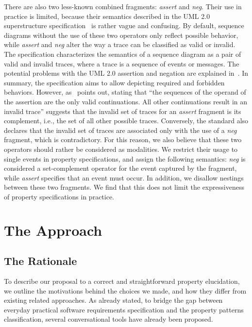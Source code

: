 \documentclass[letter]{llncs}
\begin{document}
There are also two less-known combined fragments: \emph{assert} and \emph{neg}. Their use in practice
is limited, because their semantics described in the UML 2.0 superstructure specification~\cite{UML2.4_superstructure}
is rather vague and confusing. By default, sequence diagrams without the use of these two operators 
only reflect possible behavior, while \emph{assert} and \emph{neg} alter the way 
a trace can be classified as valid or invalid. The specification characterizes
the semantics of a sequence diagram as a pair of valid and invalid traces,
where a trace is a sequence of events or messages.
The potential problems with the UML 2.0 assertion and negation are explained in~\cite{Harel07assertand}.
In summary, the specification aims to allow depicting required and forbidden behaviors.
However, as~\cite{Harel07assertand} points out, stating that ``the sequences of the operand of the assertion are the only valid continuations. All other continuations result in an invalid trace''
suggests that the invalid set of traces for an \emph{assert} fragment is its complement, i.e., the set of all other possible traces.
Conversely, the standard also declares that the
invalid set of traces are associated only with the use of
a \emph{neg} fragment, which is contradictory.
For this reason, we also believe that these two operators should rather be considered 
as modalities. We restrict their usage to single events in property specifications, and assign the following semantics:
\emph{neg} is considered a set-complement operator for the event captured by the fragment, while \emph{assert}
specifies that an event must occur. In addition, we
disallow nestings between these two fragments.
We find that this does not limit the expressiveness of property specifications in practice.
\vspace{-8 pt}
\section{The Approach}
\label{sec:Approach}
\vspace{-7 pt}

\subsection{The Rationale}
\vspace{-7 pt}
To describe our proposal to a correct and straightforward property elucidation,
we outline the motivations behind the choices we made, and how they differ from
existing related approaches. As already stated, to bridge the gap between everyday practical software 
requirements specification and the property patterns classification,
several conversational tools have already been proposed. 
\end{document}
